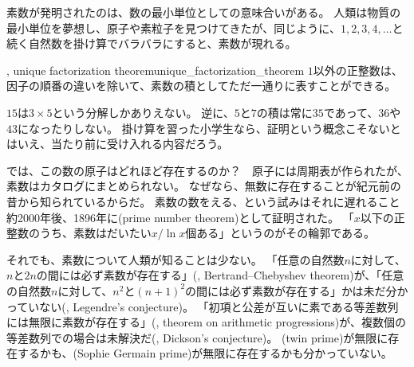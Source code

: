 素数が発明されたのは、数の最小単位としての意味合いがある。
人類は物質の最小単位を夢想し、原子や素粒子を見つけてきたが、同じように、$1,2,3,4,\ldots$と続く自然数を掛け算でバラバラにすると、素数が現れる。

\begin{Theo}{, unique factorization theorem}{unique_factorization_theorem}
$1$以外の正整数は、因子の順番の違いを除いて、素数の積としてただ一通りに表すことができる。
\end{Theo}

$15$は$3\times5$という分解しかありえない。
逆に、$5$と$7$の積は常に$35$であって、$36$や$43$になったりしない。
掛け算を習った小学生なら、証明という概念こそないとはいえ、当たり前に受け入れる内容だろう。

では、この数の原子はどれほど存在するのか？　原子には周期表が作られたが、素数はカタログにまとめられない。
なぜなら、無数に存在することが紀元前の昔から知られているからだ。
素数の数をえる、という試みはそれに遅れること約2000年後、1896年に(prime number theorem)として証明された。
「$x$以下の正整数のうち、素数はだいたい$x/\ln x$個ある」というのがその輪郭である。

それでも、素数について人類が知ることは少ない。
「任意の自然数$n$に対して、$n$と$2n$の間には必ず素数が存在する」(, Bertrand–Chebyshev theorem)が、「任意の自然数$n$に対して、$n^2$と$(n+1)^2$の間には必ず素数が存在する」かは未だ分かっていない(, Legendre's conjecture)。
「初項と公差が互いに素である等差数列には無限に素数が存在する」(, theorem on arithmetic progressions)が、複数個の等差数列での場合は未解決だ(, Dickson's conjecture)。
(twin prime)が無限に存在するかも、(Sophie Germain prime)が無限に存在するかも分かっていない。

